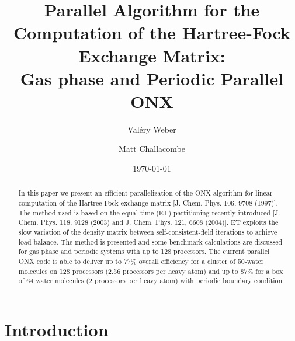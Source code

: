 \documentclass[twocolumn,showkeys,showpacs,preprintnumbers,amsmath,amssymb]{revtex4}
\begin{document}

\title{Parallel Algorithm for the Computation of the Hartree-Fock
       Exchange Matrix: \\ Gas phase and Periodic Parallel ONX}

\author{Val\'ery Weber}
%
\author{Matt Challacombe}%
%

\date{\today}%

\begin{abstract}
 In this paper we present an efficient parallelization
 of the ONX algorithm for linear computation of 
 the Hartree-Fock exchange matrix [J. Chem. Phys. 106, 9708 (1997)]. The method
 used is based on the equal time (ET) partitioning recently
 introduced [J. Chem. Phys. 118, 9128 (2003) and J. Chem. Phys. 121, 6608 (2004)]. 
 ET exploits the slow variation of the density matrix between self-consistent-field iterations
 to achieve load balance.
 The method is presented and some benchmark 
 calculations are discussed for gas phase and periodic systems
 with up to 128 processors.
 The current parallel ONX code is able to deliver up to 77\% overall
 efficiency for a cluster of 50-water molecules on 128 processors 
 (2.56 processors per heavy atom) and up to 87\% for a box of 64 
 water molecules (2 processors per heavy atom) with periodic boundary condition.
 
\end{abstract}

\maketitle

\section{Introduction}
\end{document}
